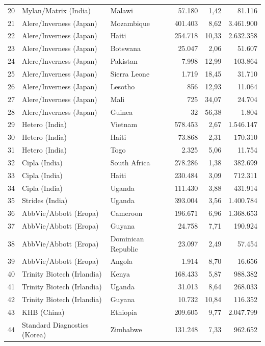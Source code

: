\documentclass[a4paper,11pt]{article}
\begin{document}
{\begin{longtable}{@{}r l l r r r@{}}
20 & Mylan/Matrix (India) & Malawi & 57.180 & 1,42 & 81.116 \\
21 & Alere/Inverness (Japan) & Mozambique & 401.403 & 8,62 & 3.461.900 \\
22 & Alere/Inverness (Japan) & Haiti & 254.718 & 10,33 & 2.632.358 \\
23 & Alere/Inverness (Japan) & Botswana & 25.047 & 2,06 & 51.607 \\
24 & Alere/Inverness (Japan) & Pakistan & 7.998 & 12,99 & 103.864 \\
25 & Alere/Inverness (Japan) & Sierra Leone & 1.719 & 18,45 & 31.710 \\
26 & Alere/Inverness (Japan) & Lesotho & 856 & 12,93 & 11.064 \\
27 & Alere/Inverness (Japan) & Mali & 725 & 34,07 & 24.704 \\
28 & Alere/Inverness (Japan) & Guinea & 32 & 56,38 & 1.804 \\
29 & Hetero (India) & Vietnam & 578.453 & 2,67 & 1.546.147 \\
30 & Hetero (India) & Haiti & 73.868 & 2,31 & 170.310 \\
31 & Hetero (India) & Togo & 2.325 & 5,06 & 11.754 \\
32 & Cipla (India) & South Africa & 278.286 & 1,38 & 382.699 \\
33 & Cipla (India) & Haiti & 230.484 & 3,09 & 712.311 \\
34 & Cipla (India) & Uganda & 111.430 & 3,88 & 431.914 \\
35 & Strides (India) & Uganda & 393.004 & 3,56 & 1.400.784 \\
36 & AbbVie/Abbott (Eropa) & Cameroon & 196.671 & 6,96 & 1.368.653 \\
37 & AbbVie/Abbott (Eropa) & Guyana & 24.758 & 7,71 & 190.924 \\
38 & AbbVie/Abbott (Eropa) & Dominican Republic & 23.097 & 2,49 & 57.454 \\
39 & AbbVie/Abbott (Eropa) & Angola & 1.914 & 8,70 & 16.656 \\
40 & Trinity Biotech (Irlandia) & Kenya & 168.433 & 5,87 & 988.382 \\
41 & Trinity Biotech (Irlandia) & Uganda & 31.013 & 8,64 & 268.033 \\
42 & Trinity Biotech (Irlandia) & Guyana & 10.732 & 10,84 & 116.352 \\
43 & KHB (China) & Ethiopia & 209.605 & 9,77 & 2.047.799 \\
44 & Standard Diagnostics (Korea) & Zimbabwe & 131.248 & 7,33 & 962.652 \\

\end{longtable}}
\end{document}
